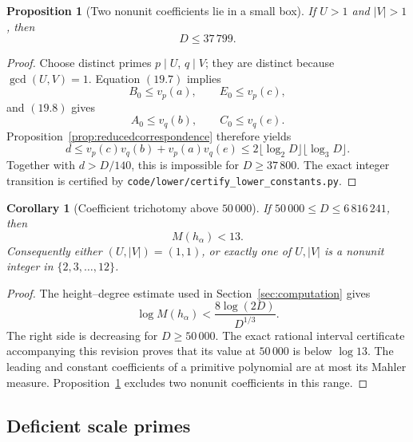 \documentclass[11pt]{article}
\newtheorem{proposition}[theorem]{Proposition}
\newtheorem{corollary}[theorem]{Corollary}
\theoremstyle{definition}
\begin{document}
\begin{proposition}[Two nonunit coefficients lie in a small box]
\label{prop:twononunit}
If \(U>1\) and \(|V|>1\), then
\begin{equation}
 D\leq37\,799.
 \tag{19.9}
\end{equation}
\end{proposition}

\begin{proof}
Choose distinct primes \(p\mid U\), \(q\mid V\); they are distinct because
\(\gcd(U,V)=1\).  Equation \((19.7)\) implies
\[
 B_0\leq v_p(a),\qquad E_0\leq v_p(c),
\]
and \((19.8)\) gives
\[
 A_0\leq v_q(b),\qquad C_0\leq v_q(e).
\]
Proposition~\ref{prop:reducedcorrespondence} therefore yields
\[
 d\leq v_p(c)v_q(b)+v_p(a)v_q(e)
 \leq2\lfloor\log_2D\rfloor\lfloor\log_3D\rfloor.
\]
Together with \(d>D/140\), this is impossible for \(D\geq37\,800\).
The exact integer transition is certified by
\texttt{code/lower/certify\_lower\_constants.py}.
\end{proof}

\begin{corollary}[Coefficient trichotomy above \(50\,000\)]
\label{cor:coefftrichotomy}
If \(50\,000\leq D\leq6\,816\,241\), then
\[
 M(h_\alpha)<13.
\]
Consequently either \((U,|V|)=(1,1)\), or exactly one of \(U,|V|\) is a
nonunit integer in \(\{2,3,\ldots,12\}\).
\end{corollary}

\begin{proof}
The height--degree estimate used in Section~\ref{sec:computation} gives
\[
 \log M(h_\alpha)<\frac{8\log(2D)}{D^{1/3}}.
\]
The right side is decreasing for \(D\geq50\,000\).  The exact rational
interval certificate accompanying this revision proves that its value at
\(50\,000\) is below \(\log13\).  The leading and constant coefficients of
a primitive polynomial are at most its Mahler measure.
Proposition~\ref{prop:twononunit} excludes two nonunit coefficients in this
range.
\end{proof}

\subsection{Deficient scale primes}
\end{document}

